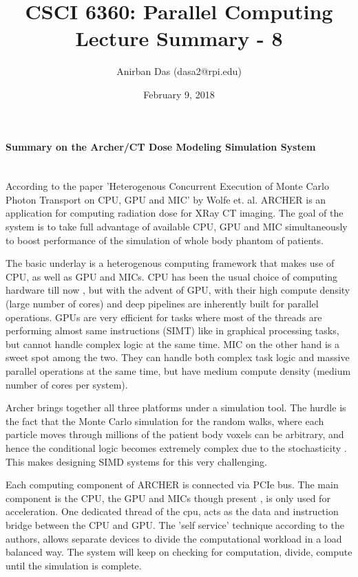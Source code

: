 \documentclass[a4paper,12 pt]{article}
\title{\vspace{-2.0cm}CSCI 6360: Parallel Computing Lecture Summary - 8}
\author{Anirban Das (dasa2@rpi.edu) }
\date{February 9, 2018}
\begin{document}
\maketitle

\paragraph{Summary on the Archer/CT Dose Modeling Simulation System\\\\}

According to the paper 'Heterogenous Concurrent Execution of Monte Carlo Photon Transport on CPU, GPU and MIC' by Wolfe et. al. ARCHER is an application for computing radiation dose for XRay CT imaging. The goal of the system is to take full advantage of available CPU, GPU and MIC simultaneously to boost performance of the simulation of whole body phantom of patients. 

The basic underlay is a heterogenous computing framework that makes use of CPU, as well as GPU and MICs. CPU has been the usual choice of computing hardware till now , but with the advent of GPU, with their high compute density (large number of cores) and deep pipelines are inherently built for parallel operations. GPUs are very efficient for tasks where most of the threads are performing almost same instructions (SIMT) like in graphical processing tasks, but cannot handle complex logic at the same time. MIC on the other hand is a sweet spot among the two. They can handle both complex task logic and massive parallel operations at the same time, but have medium compute density (medium number of cores per system). 

Archer brings together all three platforms under a simulation tool. The hurdle is the fact that the Monte Carlo simulation for the random walks, where each particle moves through millions of the patient body voxels can be arbitrary, and hence the conditional logic becomes extremely complex due to the stochasticity . This makes designing SIMD systems for this very challenging.

Each computing component of ARCHER is connected via PCIe bus. The main component is the CPU, the GPU and MICs though present , is only used for acceleration. One dedicated thread of the cpu, acts as the data and instruction bridge between the CPU and GPU. The 'self service' technique according to the authors, allows separate devices to divide the computational workload in a load balanced way. The system will keep on checking for computation, divide, compute until the simulation is complete.
\end{document}
